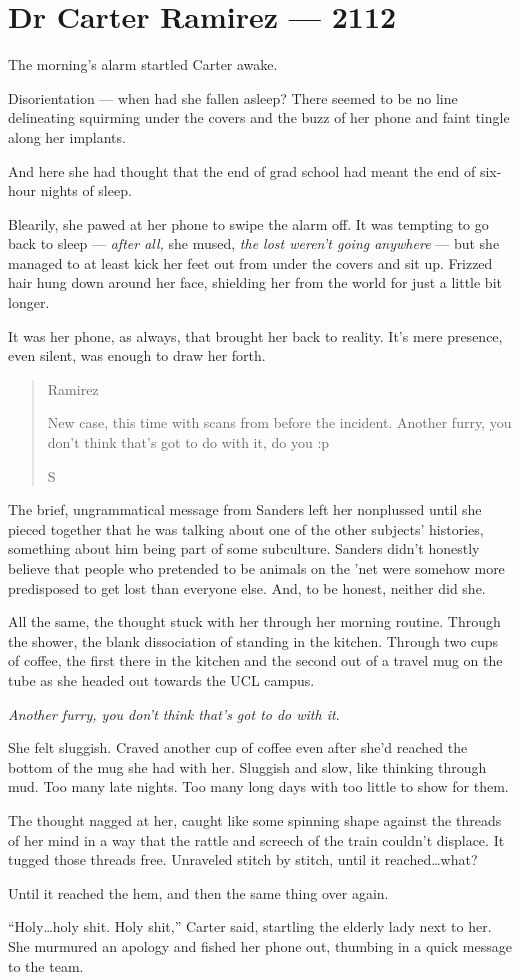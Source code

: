 \hypertarget{dr-carter-ramirez-2112}{%
\chapter*{Dr Carter Ramirez — 2112}\label{dr-carter-ramirez-2112}}

The morning's alarm startled Carter awake.

Disorientation — when had she fallen asleep? There seemed to be no line delineating squirming under the covers and the buzz of her phone and faint tingle along her implants.

And here she had thought that the end of grad school had meant the end of six-hour nights of sleep.

Blearily, she pawed at her phone to swipe the alarm off. It was tempting to go back to sleep — \emph{after all,} she mused, \emph{the lost weren't going anywhere} — but she managed to at least kick her feet out from under the covers and sit up. Frizzed hair hung down around her face, shielding her from the world for just a little bit longer.

It was her phone, as always, that brought her back to reality. It's mere presence, even silent, was enough to draw her forth.

\begin{quote}
Ramirez

New case, this time with scans from before the incident. Another furry, you don't think that's got to do with it, do you :p

S
\end{quote}

The brief, ungrammatical message from Sanders left her nonplussed until she pieced together that he was talking about one of the other subjects' histories, something about him being part of some subculture. Sanders didn't honestly believe that people who pretended to be animals on the 'net were somehow more predisposed to get lost than everyone else. And, to be honest, neither did she.

All the same, the thought stuck with her through her morning routine. Through the shower, the blank dissociation of standing in the kitchen. Through two cups of coffee, the first there in the kitchen and the second out of a travel mug on the tube as she headed out towards the UCL campus.

\emph{Another furry, you don't think that's got to do with it}.

She felt sluggish. Craved another cup of coffee even after she'd reached the bottom of the mug she had with her. Sluggish and slow, like thinking through mud. Too many late nights. Too many long days with too little to show for them.

The thought nagged at her, caught like some spinning shape against the threads of her mind in a way that the rattle and screech of the train couldn't displace. It tugged those threads free. Unraveled stitch by stitch, until it reached\ldots{}what?

Until it reached the hem, and then the same thing over again.

``Holy\ldots{}holy shit. Holy shit,'' Carter said, startling the elderly lady next to her. She murmured an apology and fished her phone out, thumbing in a quick message to the team.
